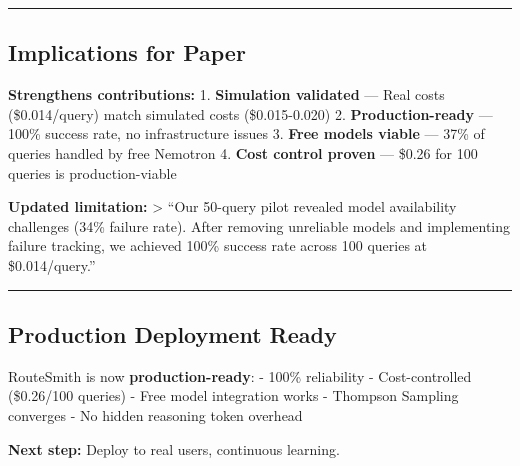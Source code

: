 \documentclass[
]{article}
\begin{document}
\begin{center}\rule{0.5\linewidth}{0.5pt}\end{center}

\hypertarget{implications-for-paper}{%
\subsection{Implications for Paper}\label{implications-for-paper}}

\textbf{Strengthens contributions:} 1. \textbf{Simulation validated} ---
Real costs (\$0.014/query) match simulated costs (\$0.015-0.020) 2.
\textbf{Production-ready} --- 100\% success rate, no infrastructure
issues 3. \textbf{Free models viable} --- 37\% of queries handled by
free Nemotron 4. \textbf{Cost control proven} --- \$0.26 for 100 queries
is production-viable

\textbf{Updated limitation:} \textgreater{} ``Our 50-query pilot
revealed model availability challenges (34\% failure rate). After
removing unreliable models and implementing failure tracking, we
achieved 100\% success rate across 100 queries at \$0.014/query.''

\begin{center}\rule{0.5\linewidth}{0.5pt}\end{center}

\hypertarget{production-deployment-ready}{%
\subsection{Production Deployment
Ready}\label{production-deployment-ready}}

RouteSmith is now \textbf{production-ready}: - 100\% reliability -
Cost-controlled (\$0.26/100 queries) - Free model integration works -
Thompson Sampling converges - No hidden reasoning token overhead

\textbf{Next step:} Deploy to real users, continuous learning.
\end{document}
